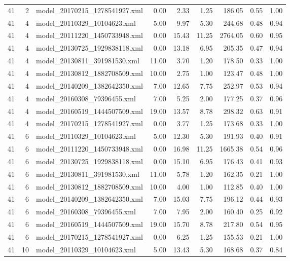 \begin{table}[ht]
\begin{tabular}{rrlrrrrrr}
   41 &   2 & model\_20170215\_1278541927.xml & 0.00 & 2.33 & 1.25 & 186.05 & 0.55 & 1.00 \\ 
   41 &   4 & model\_20110329\_10104623.xml & 5.00 & 9.97 & 5.30 & 244.68 & 0.48 & 0.94 \\ 
   41 &   4 & model\_20111220\_1450733948.xml & 0.00 & 15.43 & 11.25 & 2764.05 & 0.60 & 0.95 \\ 
   41 &   4 & model\_20130725\_1929838118.xml & 0.00 & 13.18 & 6.95 & 205.35 & 0.47 & 0.94 \\ 
   41 &   4 & model\_20130811\_391981530.xml & 11.00 & 3.70 & 1.20 & 178.50 & 0.33 & 1.00 \\ 
   41 &   4 & model\_20130812\_1882708509.xml & 10.00 & 2.75 & 1.00 & 123.47 & 0.48 & 1.00 \\ 
   41 &   4 & model\_20140209\_1382642350.xml & 7.00 & 12.65 & 7.75 & 252.97 & 0.53 & 0.94 \\ 
   41 &   4 & model\_20160308\_79396455.xml & 7.00 & 5.25 & 2.00 & 177.25 & 0.37 & 0.96 \\ 
   41 &   4 & model\_20160519\_1444507509.xml & 19.00 & 13.57 & 8.78 & 298.32 & 0.63 & 0.91 \\ 
   41 &   4 & model\_20170215\_1278541927.xml & 0.00 & 3.77 & 1.25 & 173.68 & 0.33 & 1.00 \\ 
   41 &   6 & model\_20110329\_10104623.xml & 5.00 & 12.30 & 5.30 & 191.93 & 0.40 & 0.91 \\ 
   41 &   6 & model\_20111220\_1450733948.xml & 0.00 & 16.98 & 11.25 & 1665.38 & 0.54 & 0.96 \\ 
   41 &   6 & model\_20130725\_1929838118.xml & 0.00 & 15.10 & 6.95 & 176.43 & 0.41 & 0.93 \\ 
   41 &   6 & model\_20130811\_391981530.xml & 11.00 & 5.78 & 1.20 & 162.35 & 0.21 & 1.00 \\ 
   41 &   6 & model\_20130812\_1882708509.xml & 10.00 & 4.00 & 1.00 & 112.85 & 0.40 & 1.00 \\ 
   41 &   6 & model\_20140209\_1382642350.xml & 7.00 & 15.03 & 7.75 & 196.12 & 0.44 & 0.93 \\ 
   41 &   6 & model\_20160308\_79396455.xml & 7.00 & 7.95 & 2.00 & 160.40 & 0.25 & 0.92 \\ 
   41 &   6 & model\_20160519\_1444507509.xml & 19.00 & 15.70 & 8.78 & 217.80 & 0.54 & 0.95 \\ 
   41 &   6 & model\_20170215\_1278541927.xml & 0.00 & 6.25 & 1.25 & 155.53 & 0.21 & 1.00 \\ 
   41 &  10 & model\_20110329\_10104623.xml & 5.00 & 13.43 & 5.30 & 168.68 & 0.37 & 0.84 \\ 

\end{tabular}
\end{table}
